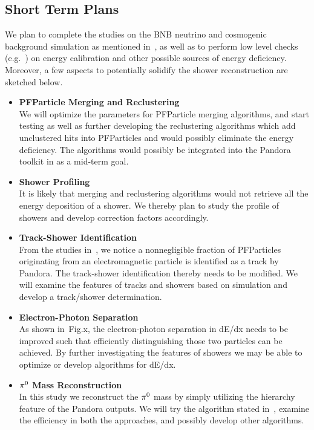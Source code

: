 \subsection{Short Term Plans}
\label{sec:plans}

We plan to complete the studies on the BNB neutrino and cosmogenic
background simulation as mentioned in~,
as well as to perform low level checks (e.g.~\cite{DocDB5814}) 
on energy calibration
and other possible sources of energy deficiency.
Moreover, a few aspects to potentially solidify the shower reconstruction
are sketched below.
\begin{itemize}
\item {\bf PFParticle Merging and Reclustering} \\
We will optimize the parameters for PFParticle merging algorithms,
and start testing as well as further developing the reclustering algorithms
which add unclustered hits into PFParticles and would possibly
eliminate the energy deficiency.
The algorithms would possibly be integrated into the Pandora
toolkit in as a mid-term goal.

\item {\bf Shower Profiling} \\
It is likely that merging and reclustering algorithms would not
retrieve all the energy deposition of a shower.
We thereby plan to study the profile of showers and develop
correction factors accordingly.

\item {\bf Track-Shower Identification} \\
From the studies in~, we notice
a nonnegligible fraction of PFParticles originating from an 
electromagnetic particle is identified as a track by Pandora.
The track-shower identification thereby needs to be modified.
We will examine the features of tracks and showers based on
simulation and develop a track/shower determination.

\item {\bf Electron-Photon Separation} \\
As shown in~Fig.x, the electron-photon separation in
dE/dx needs to be improved such that efficiently distinguishing 
those two particles can be achieved.
By further investigating the features of showers we may be able 
to optimize or develop algorithms for dE/dx.

\item {\bf ${\pi}^0$ Mass Reconstruction} \\
In this study we reconstruct the ${\pi}^0$ mass by
simply utilizing the hierarchy feature of the 
Pandora outputs.
We will try the algorithm stated in~\cite{DocDB5520}, examine
the efficiency in both the approaches, and possibly develop
other algorithms.
\end{itemize}

